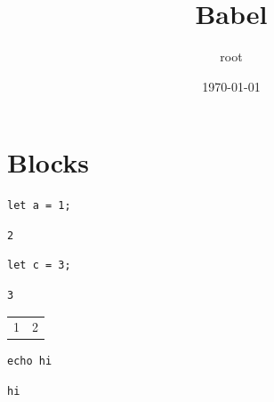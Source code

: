 \documentclass[11pt]{article}
\author{root}
\date{\today}
\title{Babel}
\begin{document}
\maketitle
\tableofcontents

\section{Blocks}
\label{sec:org313bfb9}
\begin{verbatim}
let a = 1;
\end{verbatim}

\begin{verbatim}
2
\end{verbatim}


\begin{verbatim}
let c = 3;
\end{verbatim}

\begin{verbatim}
3
\end{verbatim}


\begin{center}
\begin{tabular}{rr}
1 & 2\\[0pt]
\end{tabular}
\end{center}

\begin{verbatim}
echo hi
\end{verbatim}

\begin{verbatim}
hi
\end{verbatim}
\end{document}
